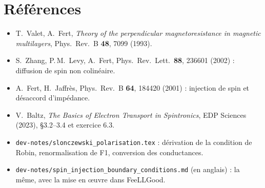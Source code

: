 \documentclass[11pt,a4paper]{article}
\begin{document}
\section*{Références}

\begin{itemize}
  \item T.~Valet, A.~Fert, \emph{Theory of the perpendicular
    magnetoresistance in magnetic multilayers}, Phys.\ Rev.\ B
    \textbf{48}, 7099 (1993).
  \item S.~Zhang, P.\,M.~Levy, A.~Fert, Phys.\ Rev.\ Lett.\ \textbf{88},
    236601 (2002) : diffusion de spin non colinéaire.
  \item A.~Fert, H.~Jaffrès, Phys.\ Rev.\ B \textbf{64}, 184420 (2001) :
    injection de spin et désaccord d'impédance.
  \item V.~Baltz, \emph{The Basics of Electron Transport in Spintronics},
    EDP Sciences (2023), §3.2--3.4 et exercice 6.3.
  \item \texttt{dev-notes/slonczewski\_polarisation.tex} : dérivation de
    la condition de Robin, renormalisation de F1, conversion des
    conductances.
  \item \texttt{dev-notes/spin\_injection\_boundary\_conditions.md} (en
    anglais) : la même, avec la mise en œuvre dans FeeLLGood.
\end{itemize}
\end{document}
